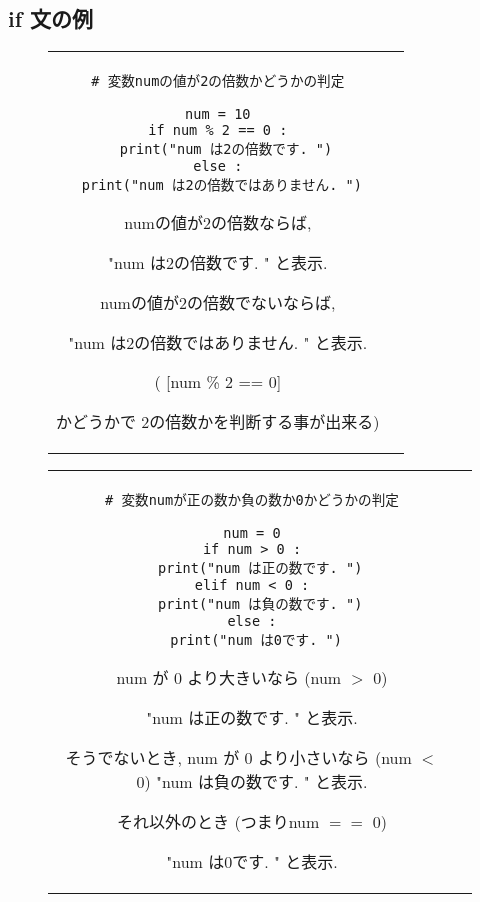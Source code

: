 \documentclass{jsarticle}
\begin{document}
\subsection{if 文の例} \vspace{-3mm}
\begin{figure}[ht]
	\begin{tabular}{cc}
		\begin{minipage}[c]{.45\textwidth}
			\begin{lstlisting}[caption=if 文の例1]
# 変数numの値が2の倍数かどうかの判定

num = 10
if num % 2 == 0 :
  print("num は2の倍数です. ")
else :
  print("num は2の倍数ではありません. ") \end{lstlisting}
		\end{minipage} \hspace{10mm}
		\begin{minipage}[c]{.46\textwidth}
			\begin{screen}
				numの値が2の倍数ならば,  \par "num は2の倍数です. " と表示.  \par
				numの値が2の倍数でないならば,  \par "num は2の倍数ではありません. " と表示. \par
				({\textgt {numを2で割ったあまりが0}} [num \% 2 == 0] \par かどうかで 2の倍数かを判断する事が出来る)
			\end{screen}
		\end{minipage}
	\end{tabular}
\end{figure}
\vspace{-5mm}
\begin{figure}[h]
	\begin{tabular}{cc}
		\begin{minipage}[c]{.5\textwidth}
			\begin{lstlisting}[caption=if 文の例2]
# 変数numが正の数か負の数か0かどうかの判定

num = 0
if num > 0 :
  print("num は正の数です. ")
elif num < 0 :
  print("num は負の数です. ")
else :
  print("num は0です. ") \end{lstlisting}
		\end{minipage} \hspace{10mm}
		\begin{minipage}[c]{.4\textwidth}
			\begin{screen}
				num が 0 より大きいなら (num $>$ 0) \par "num は正の数です. " と表示.  \par
				そうでないとき, num が 0 より小さいなら (num $<$ 0) "num は負の数です. " と表示.  \par
				それ以外のとき (つまりnum $==$ 0) \par "num は0です. " と表示.  \par
			\end{screen}
		\end{minipage}
	\end{tabular}
\end{figure}
\end{document}
